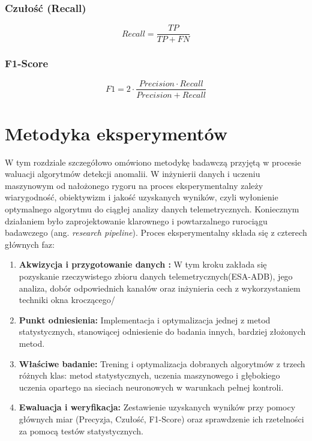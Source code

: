 \documentclass[a4paper,twoside,12pt]{book}
\newcommand{\obcy}[1]{\emph{#1}}
\newcommand{\english}[1]{{\selectlanguage{british}\obcy{#1}}}
\begin{document}
	\subsection{Czułość (Recall)}
	
	
	\begin{equation}
		Recall = \frac{TP}{TP + FN}
		\label{eq:recall}
	\end{equation} 
	\cite{sathyanarayanan2024confusion}
	
	\subsection{F1-Score}
	
	\begin{equation}
		F1 = 2 \cdot \frac{Precision \cdot Recall}{Precision + Recall}
		\label{eq:f1score}
	\end{equation}
	
	\cite{sathyanarayanan2024confusion}
	
	
	\chapter{Metodyka eksperymentów} 
	
	W tym rozdziale szczegółowo omówiono metodykę badawczą przyjętą w procesie waluacji algorytmów detekcji anomalii. W inżynierii danych i uczeniu maszynowym od nałożonego rygoru na proces eksperymentalny zależy wiarygodność, obiektywizm i jakość uzyskanych wyników, czyli wyłonienie optymalnego algorytmu do ciągłej analizy danych telemetrycznych. Koniecznym działaniem było zaprojektowanie klarownego i powtarzalnego rurociągu badawczego (ang. \english{research pipeline}).
	Proces eksperymentalny składa się z czterech głównych faz:
	\begin{enumerate}
		\item \textbf{Akwizycja i przygotowanie danych :} W tym kroku zakłada się pozyskanie rzeczywistego zbioru danych telemetrycznych(ESA-ADB), jego analiza, dobór odpowiednich kanałów oraz inżynieria cech z wykorzystaniem techniki okna kroczącego/
		\item \textbf {Punkt odniesienia:} Implementacja i optymalizacja jednej z metod statystycznych, stanowiącej odniesienie do badania innych, bardziej złożonych metod.
		\item \textbf{Właściwe badanie:} Trening i optymalizacja dobranych algorytmów z trzech różnych klas: metod statystycznych, uczenia maszynowego i głębokiego uczenia opartego na sieciach neuronowych w warunkach pełnej kontroli.
		\item \textbf {Ewaluacja i weryfikacja:} Zestawienie uzyskanych wyników przy pomocy głównych miar (Precyzja, Czułość, F1-Score) oraz sprawdzenie ich rzetelności za pomocą testów statystycznych.
	\end{enumerate}
	
\end{document}
